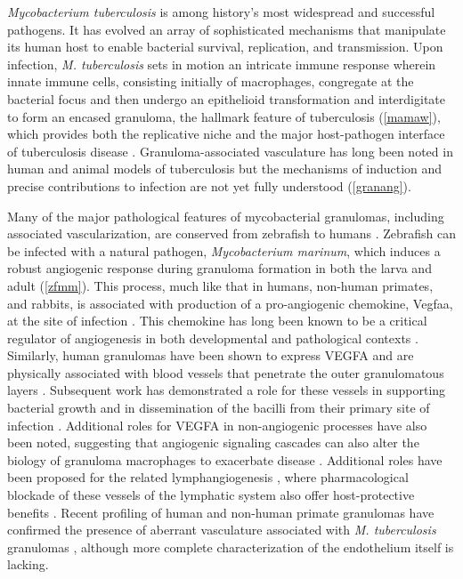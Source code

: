 \textit{Mycobacterium tuberculosis} is among history's most widespread and successful pathogens. It has evolved an array of sophisticated mechanisms that manipulate its human host to enable bacterial survival, replication, and transmission. Upon infection, \textit{M. tuberculosis} sets in motion an intricate immune response wherein innate immune cells, consisting initially of macrophages, congregate at the bacterial focus and then undergo an epithelioid transformation and interdigitate to form an encased granuloma, the hallmark feature of tuberculosis (\autoref{mamaw}), which provides both the replicative niche and the major host\hyp{}pathogen interface of tuberculosis disease \citep{Cronan2016, Pagan2018, Cronan2021}. Granuloma\hyp{}associated vasculature has long been noted in human and animal models of tuberculosis \citep{Cudkowicz1952, Russell2010} but the mechanisms of induction and precise contributions to infection are not yet fully understood (\autoref{granang}).

Many of the major pathological features of mycobacterial granulomas, including associated vascularization, are conserved from zebrafish to humans \citep{Swaim2006, Bohrer2021}. Zebrafish can be infected with a natural pathogen, \textit{Mycobacterium marinum}, which induces a robust angiogenic response during granuloma formation in both the larva and adult (\autoref{zfmm}). This process, much like that in humans, non\hyp{}human primates, and rabbits, is associated with production of a pro\hyp{}angiogenic chemokine, Vegfaa, at the site of infection \citep{Oehlers2015}. This chemokine has long been known to be a critical regulator of angiogenesis in both developmental and pathological contexts \citep{Chung2011, Leung1989, Adams2007}. Similarly, human granulomas have been shown to express VEGFA and are physically associated with blood vessels that penetrate the outer granulomatous layers \citep{Datta2015, Guirado2013b}. Subsequent work has demonstrated a role for these vessels in supporting bacterial growth and in dissemination of the bacilli from their primary site of infection \citep{Polena2016}. Additional roles for VEGFA in non\hyp{}angiogenic processes have also been noted, suggesting that angiogenic signaling cascades can also alter the biology of granuloma macrophages to exacerbate disease \citep{Harding2019}. Additional roles have been proposed for the related lymphangiogenesis \citep{Alitalo2005, Duong2012, Lerner2020}, where pharmacological blockade of these vessels of the lymphatic system also offer host\hyp{}protective benefits \citep{Harding2015}. Recent profiling of human and non\hyp{}human primate granulomas have confirmed the presence of aberrant vasculature associated with \textit{M. tuberculosis} granulomas \citep{Gideon2022, McCaffrey2022, Cronan2021}, although more complete characterization of the endothelium itself is lacking.


